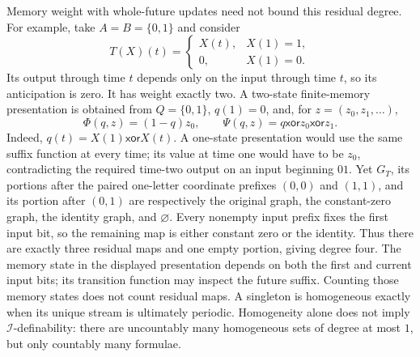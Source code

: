 Memory weight with whole-future updates need not bound this residual degree.
For example, take \(A=B=\{0,1\}\) and consider
\[
 T(X)(t)=
 \begin{cases}
  X(t),&X(1)=1,\\
  0,&X(1)=0.
 \end{cases}
\]
Its output through time \(t\) depends only on the input through time \(t\), so
its anticipation is zero.  It has weight exactly two.  A two-state
finite-memory presentation is obtained from
\(Q=\{0,1\}\), \(q(1)=0\), and, for
\(z=(z_0,z_1,\ldots)\),
\[
 \Phi(q,z)=(1-q)z_0,
 \qquad
 \Psi(q,z)=q\mathbin{\mathsf{xor}}z_0\mathbin{\mathsf{xor}}z_1.
\]
Indeed, \(q(t)=X(1)\mathbin{\mathsf{xor}}X(t)\).  A one-state presentation
would use the same suffix function at every time; its value at time one would
have to be \(z_0\), contradicting the required time-two output on an input
beginning \(01\).  Yet \(G_T\), its portions after the paired one-letter
coordinate prefixes \((0,0)\) and \((1,1)\), and its portion after
\((0,1)\) are respectively the original graph, the constant-zero graph, the
identity graph, and \(\varnothing\).  Every nonempty input prefix fixes
the first input bit, so the remaining map is either constant zero or the
identity.  Thus there are exactly three residual maps and one empty portion,
giving degree four.  The memory state in the displayed presentation depends
on both the first and current input bits; its transition function may inspect
the future suffix.  Counting those memory states does not count residual maps.
A singleton is homogeneous exactly when its unique stream is ultimately
periodic.  Homogeneity alone does not imply \(\mathcal I\)-definability: there
are uncountably many homogeneous sets of degree at most \(1\), but only
countably many formulae.

